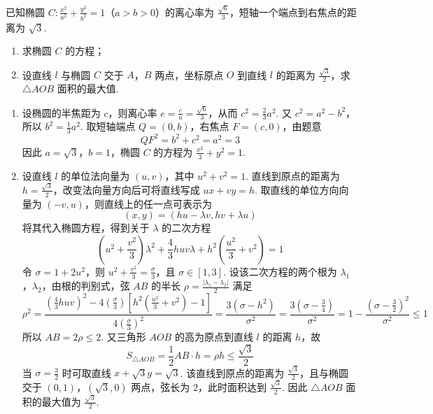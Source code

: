 \begin{problem}
已知椭圆 \(C: \frac{x^2}{a^2} + \frac{y^2}{b^2} = 1\)（\(a > b > 0\)）的离心率为 \(\frac{\sqrt{6}}{3}\)，短轴一个端点到右焦点的距离为 \(\sqrt{3}\).
\begin{enumerate}
\item 求椭圆 \(C\) 的方程；
\item 设直线 \(l\) 与椭圆 \(C\) 交于 \(A\)，\(B\) 两点，坐标原点 \(O\) 到直线 \(l\) 的距离为 \( \frac{\sqrt{3}}{2} \)，求 \( \triangle AOB \) 面积的最大值.
\end{enumerate}
\end{problem}

\begin{solution}
\begin{enumerate}
\item 设椭圆的半焦距为 \(c\)，则离心率 \(e=\frac{c}{a}=\frac{\sqrt{6}}{3}\)，从而 \(c^2=\frac{2}{3}a^2\). 又 \(c^2=a^2-b^2\)，所以 \(b^2=\frac{1}{3}a^2\). 取短轴端点 \(Q=(0,b)\)，右焦点 \(F=(c,0)\)，由题意
\[
QF^2=b^2+c^2=a^2=3
\]
因此 \(a=\sqrt{3}\)，\(b=1\)，椭圆 \(C\) 的方程为 \(\frac{x^2}{3}+y^2=1\).
\item 设直线 \(l\) 的单位法向量为 \((u,v)\)，其中 \(u^2+v^2=1\). 直线到原点的距离为 \(h=\frac{\sqrt{3}}{2}\)，改变法向量方向后可将直线写成 \(ux+vy=h\). 取直线的单位方向向量为 \((-v,u)\)，则直线上的任一点可表示为
\[
(x,y)=(hu-\lambda v,hv+\lambda u)
\]
将其代入椭圆方程，得到关于 \(\lambda\) 的二次方程
\[
\left(u^2+\frac{v^2}{3}\right)\lambda^2+\frac{4}{3}huv\lambda+h^2\left(\frac{u^2}{3}+v^2\right)=1
\]
令 \(\sigma=1+2u^2\)，则 \(u^2+\frac{v^2}{3}=\frac{\sigma}{3}\)，且 \(\sigma\in[1,3]\). 设该二次方程的两个根为 \(\lambda_1\)，\(\lambda_2\)，由根的判别式，弦 \(AB\) 的半长 \(\rho=\frac{|\lambda_1-\lambda_2|}{2}\) 满足
\[
\rho^2=\frac{\left(\frac{4}{3}huv\right)^2-4\left(\frac{\sigma}{3}\right)\left[h^2\left(\frac{u^2}{3}+v^2\right)-1\right]}{4\left(\frac{\sigma}{3}\right)^2}
=\frac{3(\sigma-h^2)}{\sigma^2}
=\frac{3(\sigma-\frac{3}{4})}{\sigma^2}
=1-\frac{(\sigma-\frac{3}{2})^2}{\sigma^2}\leqslant1
\]
所以 \(AB=2\rho\leqslant2\). 又三角形 \(AOB\) 的高为原点到直线 \(l\) 的距离 \(h\)，故
\[
S_{\triangle AOB}=\frac{1}{2}AB\cdot h=\rho h\leqslant\frac{\sqrt{3}}{2}
\]
当 \(\sigma=\frac{3}{2}\) 时可取直线 \(x+\sqrt{3}y=\sqrt{3}\). 该直线到原点的距离为 \(\frac{\sqrt{3}}{2}\)，且与椭圆交于 \((0,1)\)，\((\sqrt{3},0)\) 两点，弦长为 \(2\)，此时面积达到 \(\frac{\sqrt{3}}{2}\). 因此 \(\triangle AOB\) 面积的最大值为 \(\frac{\sqrt{3}}{2}\).
\end{enumerate}
\end{solution}

